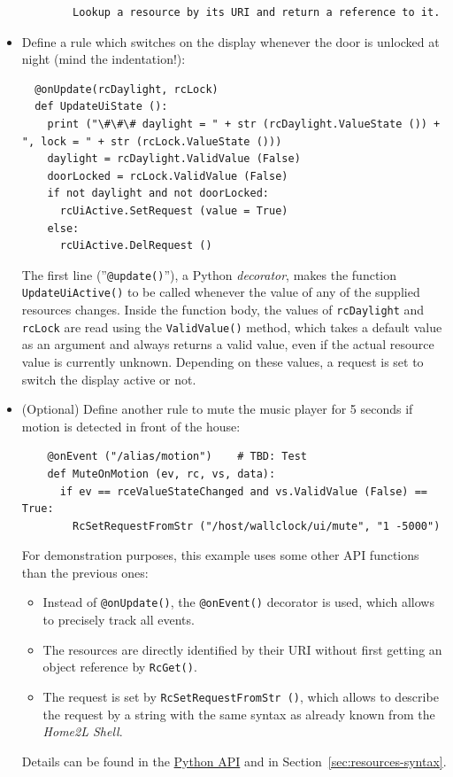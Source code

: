 \documentclass[12pt,english,parskip=half]{scrreprt}
\newcommand{\projecturl}{}
\newcommand{\docref}[2]{\href{\projecturl#1}{#2}}
\newcommand{\refapipython}{\docref{home2l-api_python/index.html}{Python API}}
\begin{document}
\begin{itemize}[$\blacktriangleright$]
\begin{lstlisting}
        Lookup a resource by its URI and return a reference to it.
  \end{lstlisting}

\item
  Define a rule which switches on the display whenever the door is unlocked at night
  (mind the indentation!):
  \begin{lstlisting}
  @onUpdate(rcDaylight, rcLock)
  def UpdateUiState ():
    print ("\#\#\# daylight = " + str (rcDaylight.ValueState ()) + ", lock = " + str (rcLock.ValueState ()))
    daylight = rcDaylight.ValidValue (False)
    doorLocked = rcLock.ValidValue (False)
    if not daylight and not doorLocked:
      rcUiActive.SetRequest (value = True)
    else:
      rcUiActive.DelRequest ()
  \end{lstlisting}

  The first line (''\texttt{@update()}''), a Python \emph{decorator},
  makes the function \texttt{UpdateUiActive()} to be called whenever
  the value of any of the supplied resources changes. Inside the function
  body, the values of \texttt{rcDaylight} and \texttt{rcLock} are
  read using the \texttt{ValidValue()} method, which takes a default
  value as an argument and always returns a valid value, even if the
  actual resource value is currently unknown. Depending on these values, a
  request is set to switch the display active or not.

\item
  (Optional) Define another rule to mute the music player for 5 seconds
  if motion is detected in front of the house:
  \begin{lstlisting}
    @onEvent ("/alias/motion")    # TBD: Test
    def MuteOnMotion (ev, rc, vs, data):
      if ev == rceValueStateChanged and vs.ValidValue (False) == True:
        RcSetRequestFromStr ("/host/wallclock/ui/mute", "1 -5000")
  \end{lstlisting}

  For demonstration purposes, this example uses some other API functions
  than the previous ones:
  \begin{itemize}
    \item
      Instead of \texttt{@onUpdate()}, the \texttt{@onEvent()} decorator is used,
      which allows to precisely track all events.
    \item
      The resources are directly identified by their URI without first getting
      an object reference by \texttt{RcGet()}.
    \item
      The request is set by \texttt{RcSetRequestFromStr ()}, which allows to describe the request
      by a string with the same syntax as already known from the \emph{Home2L Shell}.
  \end{itemize}
  Details can be found in the \refapipython{} and in Section~\ref{sec:resources-syntax}.


\end{itemize}
\end{document}

